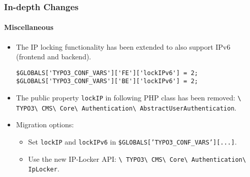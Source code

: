 
\begin{frame}[fragile]
	\frametitle{In-depth Changes}
	\framesubtitle{Miscellaneous}

	\lstset{basicstyle=\tiny\ttfamily}

	\begin{itemize}

		\item  The IP locking functionality has been extended to also support IPv6
			(frontend and backend).
\begin{lstlisting}
$GLOBALS['TYPO3_CONF_VARS']['FE']['lockIPv6'] = 2;
$GLOBALS['TYPO3_CONF_VARS']['BE']['lockIPv6'] = 2;
\end{lstlisting}

		\item The public property \texttt{lockIP} in following PHP class has been removed:\newline
			\small
				\texttt{\textbackslash
					TYPO3\textbackslash
					CMS\textbackslash
					Core\textbackslash
					Authentication\textbackslash
					AbstractUserAuthentication}.
			\normalsize

		\item Migration options:

			\begin{itemize}\smaller
				\item[\ding{228}] Set \texttt{lockIP} and \texttt{lockIPv6} in \texttt{\$GLOBALS['TYPO3\_CONF\_VARS'][...]}.
				\item[\ding{228}] Use the new IP-Locker API:
					\texttt{\textbackslash
						TYPO3\textbackslash
						CMS\textbackslash
						Core\textbackslash
						Authentication\textbackslash
						IpLocker}.
			\end{itemize}\normalsize

	\end{itemize}

\end{frame}

